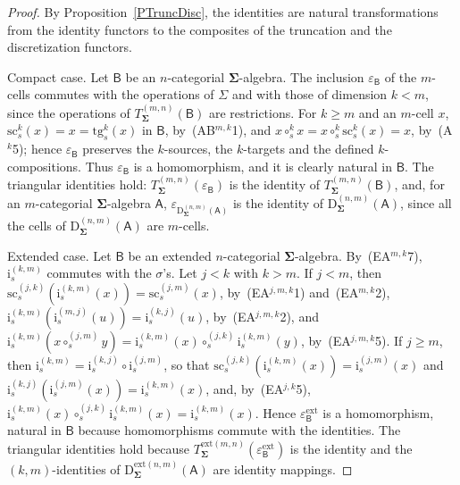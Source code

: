 \documentclass{amsart}
\theoremstyle{plain}
\theoremstyle{definition}
\begin{document}
\begin{proof}
By Proposition~\ref{PTruncDisc}, the identities are natural transformations from the identity functors to the composites of the truncation and the discretization functors.

Compact case. Let $\boldsymbol{\mathsf{B}}$ be an $n$-categorial $\mathbf{\Sigma}$-algebra. The inclusion $\varepsilon_{\boldsymbol{\mathsf{B}}}$ of the $m$-cells commutes with the operations of $\Sigma$ and with those of dimension $k<m$, since the operations of $T^{(m,n)}_{\mathbf{\Sigma}}(\boldsymbol{\mathsf{B}})$ are restrictions. For $k\geq m$ and an $m$-cell $x$, $\mathrm{sc}^{k}_{s}(x)=x=\mathrm{tg}^{k}_{s}(x)$ in $\boldsymbol{\mathsf{B}}$, by~(AB$^{m,k}$1), and $x\circ^{k}_{s}x=x\circ^{k}_{s}\mathrm{sc}^{k}_{s}(x)=x$, by~(A$^{k}$5); hence $\varepsilon_{\boldsymbol{\mathsf{B}}}$ preserves the $k$-sources, the $k$-targets and the defined $k$-compositions. Thus $\varepsilon_{\boldsymbol{\mathsf{B}}}$ is a homomorphism, and it is clearly natural in $\boldsymbol{\mathsf{B}}$. The triangular identities hold: $T^{(m,n)}_{\mathbf{\Sigma}}(\varepsilon_{\boldsymbol{\mathsf{B}}})$ is the identity of $T^{(m,n)}_{\mathbf{\Sigma}}(\boldsymbol{\mathsf{B}})$, and, for an $m$-categorial $\mathbf{\Sigma}$-algebra $\boldsymbol{\mathsf{A}}$, $\varepsilon_{\mathrm{D}^{(n,m)}_{\mathbf{\Sigma}}(\boldsymbol{\mathsf{A}})}$ is the identity of $\mathrm{D}^{(n,m)}_{\mathbf{\Sigma}}(\boldsymbol{\mathsf{A}})$, since all the cells of $\mathrm{D}^{(n,m)}_{\mathbf{\Sigma}}(\boldsymbol{\mathsf{A}})$ are $m$-cells.

Extended case. Let $\boldsymbol{\mathsf{B}}$ be an extended $n$-categorial $\mathbf{\Sigma}$-algebra. By~(EA$^{m,k}$7), $\mathrm{i}^{(k,m)}_{s}$ commutes with the $\sigma$'s. Let $j<k$ with $k>m$. If $j<m$, then $\mathrm{sc}^{(j,k)}_{s}(\mathrm{i}^{(k,m)}_{s}(x))=\mathrm{sc}^{(j,m)}_{s}(x)$, by~(EA$^{j,m,k}$1) and~(EA$^{m,k}$2), $\mathrm{i}^{(k,m)}_{s}(\mathrm{i}^{(m,j)}_{s}(u))=\mathrm{i}^{(k,j)}_{s}(u)$, by~(EA$^{j,m,k}$2), and $\mathrm{i}^{(k,m)}_{s}(x\circ^{(j,m)}_{s}y)=\mathrm{i}^{(k,m)}_{s}(x)\circ^{(j,k)}_{s}\mathrm{i}^{(k,m)}_{s}(y)$, by~(EA$^{j,m,k}$5). If $j\geq m$, then $\mathrm{i}^{(k,m)}_{s}=\mathrm{i}^{(k,j)}_{s}\circ\mathrm{i}^{(j,m)}_{s}$, so that $\mathrm{sc}^{(j,k)}_{s}(\mathrm{i}^{(k,m)}_{s}(x))=\mathrm{i}^{(j,m)}_{s}(x)$ and $\mathrm{i}^{(k,j)}_{s}(\mathrm{i}^{(j,m)}_{s}(x))=\mathrm{i}^{(k,m)}_{s}(x)$, and, by~(EA$^{j,k}$5), $\mathrm{i}^{(k,m)}_{s}(x)\circ^{(j,k)}_{s}\mathrm{i}^{(k,m)}_{s}(x)=\mathrm{i}^{(k,m)}_{s}(x)$. Hence $\varepsilon^{\mathrm{ext}}_{\boldsymbol{\mathsf{B}}}$ is a homomorphism, natural in $\boldsymbol{\mathsf{B}}$ because homomorphisms commute with the identities. The triangular identities hold because $T^{\mathrm{ext}(m,n)}_{\mathbf{\Sigma}}(\varepsilon^{\mathrm{ext}}_{\boldsymbol{\mathsf{B}}})$ is the identity and the $(k,m)$-identities of $\mathrm{D}^{\mathrm{ext}(n,m)}_{\mathbf{\Sigma}}(\boldsymbol{\mathsf{A}})$ are identity mappings.
\end{proof}
\end{document}
